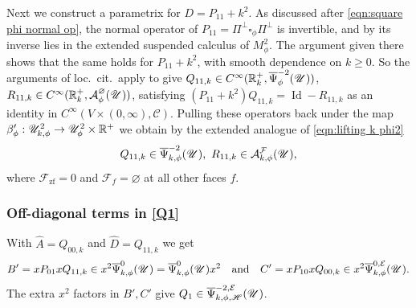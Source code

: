 \documentclass[11pt]{article}
\numberwithin{equation}{section}
\theoremstyle{plain}
\theoremstyle{definition}
\newcommand{\R}{{\mathbb{R}}}
\newcommand\calA{{\mathcal A}}
\newcommand\calE{{\mathcal E}}
\newcommand\calF{{\mathcal F}}
\newcommand{\zf}{{\mathrm{zf}}}
\DeclareMathOperator{\Id}{Id}
\newcommand{\Cinf}{C^\infty}
\newcommand{\Piperp}{\Pi^\perp}
\newcommand{\Psibar}{\overline{\Psi}}
\begin{document}
Next we construct a parametrix for $D=P_{11}+k^2$.
As discussed after \eqref{eqn:square phi normal op}, the normal operator of $P_{11}=\Piperp\square_\phi\Piperp$ is invertible, and by \cite[Prop.\,2.3]{grieser-para} its inverse lies in the extended suspended calculus of $M^2_\phi$. The argument given there shows that the same holds for $P_{11}+k^2$, with smooth dependence on $k\geq0$. So the arguments of loc.\ cit.\ apply to give $Q_{11,k} \in\Cinf(\R_{k}^+,\Psibar^{-2}_\phi(\U))$, $R_{11,k}\in\Cinf(\R_{k}^+,\calA^{\varnothing}_\phi(\U))$, satisfying $(P_{11}+k^2)Q_{11,k}=\Id - R_{11,k}$ as an identity in $\Cinf(V\times(0,\infty),\mathscr{C})$.
Pulling these operators back under the map $\beta'_{\phi} : \U^{2}_{k,\phi} \to \U^{2}_{\phi}\times \R^+$ we obtain by the extended analogue of \eqref{eqn:lifting k phi2}
\[
Q_{11,k}\in \Psibar^{-2}_{k,\phi}(\U),\ R_{11,k} \in \calA^{\calF}_{k,\phi}(\U),
\]
where $\calF_\zf=0$ and $\calF_f=\varnothing$ at all other faces $f$.

\subsubsection*{Off-diagonal terms in \eqref{Q1}}
With $\widehat{A}=Q_{00,k}$ and $\widehat{D}=Q_{11,k}$ we get
\[
B'=xP_{01}x Q_{11,k}\in x^2\Psibar^{0}_{k,\phi}(\U)=\Psibar^{0}_{k,\phi}(\U) x^2\quad\text{and}\quad C'=xP_{10}x Q_{00,k} \in x^2\Psibar_{k,\phi}^{0,\calE}(\U).
\]
The extra $x^2$ factors in $B',C'$ give $Q_1\in \Psibar_{k,\phi,\mathscr{H}}^{-2,\calE}(\U)$.
\end{document}
